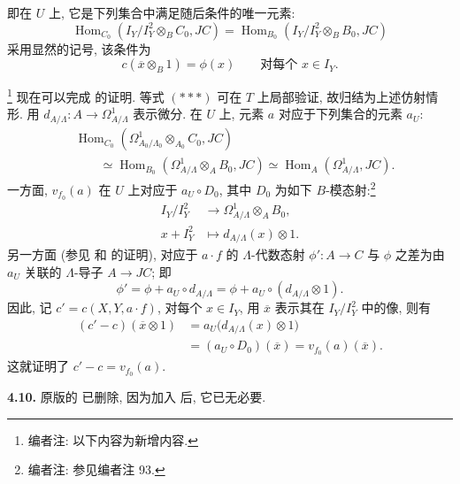 \begin{center}
\end{center}

即在 \(U\) 上, 它是下列集合中满足随后条件的唯一元素:
\[
 \operatorname{Hom}_{C_0}
 \left(I_Y/I_Y^2\otimes_B C_0,JC\right)
 =
 \operatorname{Hom}_{B_0}
 \left(I_Y/I_Y^2\otimes_B B_0,JC\right)
\]
采用显然的记号, 该条件为
\[
 c(\overline x\otimes_B1)=\phi(x)
 \qquad\text{对每个 \(x\in I_Y\).}
\]

\footnote{编者注: 以下内容为新增内容.}
现在可以完成 的证明.
等式 \((***)\) 可在 \(T\) 上局部验证, 故归结为上述仿射情形.
用 \(d_{A/\Lambda}:A\to\Omega^1_{A/\Lambda}\) 表示微分.
在 \(U\) 上, 元素 \(a\) 对应于下列集合的元素 \(a_U\):
\[
 \begin{split}
 &\operatorname{Hom}_{C_0}
 \left(\Omega^1_{A_0/\Lambda_0}\otimes_{A_0}C_0,JC\right)
 \\[-0.15em]
 &\qquad\simeq
 \operatorname{Hom}_{B_0}
 \left(\Omega^1_{A/\Lambda}\otimes_A B_0,JC\right)
 \simeq
 \operatorname{Hom}_{A}(\Omega^1_{A/\Lambda},JC).
 \end{split}
\]
一方面, \(v_{f_0}(a)\) 在 \(U\) 上对应于
\(a_U\circ D_0\), 其中 \(D_0\) 为如下 \(B\)-模态射:\footnote{编者注: 参见编者注 93.}
\[
 \begin{aligned}
 I_Y/I_Y^2&\longrightarrow\Omega^1_{A/\Lambda}\otimes_A B_0,\\
 x+I_Y^2&\longmapsto d_{A/\Lambda}(x)\otimes1.
 \end{aligned}
\]
另一方面 (参见 和 的证明),
对应于 \(a\cdot f\) 的 \(\Lambda\)-代数态射 \(\phi':A\to C\)
与 \(\phi\) 之差为由 \(a_U\) 关联的 \(\Lambda\)-导子 \(A\to JC\); 即
\[
 \phi'=\phi+a_U\circ d_{A/\Lambda}
 =\phi+a_U\circ(d_{A/\Lambda}\otimes1).
\]
因此, 记 \(c'=c(X,Y,a\cdot f)\), 对每个 \(x\in I_Y\),
用 \(\overline x\) 表示其在 \(I_Y/I_Y^2\) 中的像, 则有
\[
 \begin{split}
 (c'-c)(\overline x\otimes1)
 &=a_U\bigl(d_{A/\Lambda}(x)\otimes1\bigr)\\
 &=(a_U\circ D_0)(\overline x)
 =v_{f_0}(a)(\overline x).
 \end{split}
\]
这就证明了 \(c'-c=v_{f_0}(a)\).

\medskip
\noindent{}\textbf{4.10.}
原版的 已删除,
因为加入 后, 它已无必要.


